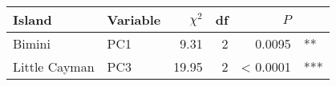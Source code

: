 
\begin{tabular}{llrrrl}
\toprule
Island & Variable & $\chi^2$ & df & $P$ & \\
\midrule
Bimini & PC1 & 9.31 & 2 & 0.0095 & **\\
Little Cayman & PC3 & 19.95 & 2 & < 0.0001 & ***\\
\bottomrule
\end{tabular}